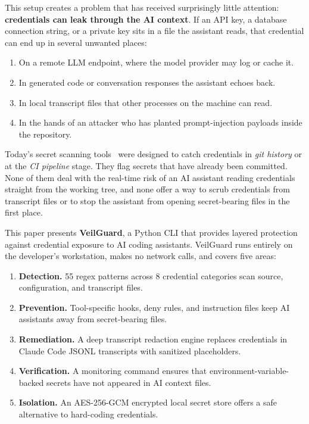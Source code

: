 \documentclass[conference]{IEEEtran}
\begin{document}
This setup creates a problem that has received surprisingly little attention:
\textbf{credentials can leak through the AI context}. If an API key, a
database connection string, or a private key sits in a file the assistant reads,
that credential can end up in several unwanted places:

\begin{enumerate}
  \item On a remote LLM endpoint, where the model provider may log or cache it.
  \item In generated code or conversation responses the assistant echoes back.
  \item In local transcript files that other processes on the machine can read.
  \item In the hands of an attacker who has planted prompt-injection payloads
        inside the repository.
\end{enumerate}

Today's secret scanning tools~\cite{gitleaks2024,trufflehog2024,
detectsecrets2024} were designed to catch credentials in \emph{git history} or
at the \emph{CI pipeline} stage. They flag secrets that have already been
committed. None of them deal with the real-time risk of an AI assistant reading
credentials straight from the working tree, and none offer a way to scrub
credentials from transcript files or to stop the assistant from opening
secret-bearing files in the first place.

This paper presents \textbf{VeilGuard}, a Python CLI that provides layered
protection against credential exposure to AI coding assistants. VeilGuard runs
entirely on the developer's workstation, makes no network calls, and covers five
areas:

\begin{enumerate}
  \item \textbf{Detection.} 55 regex patterns across 8 credential categories
        scan source, configuration, and transcript files.
  \item \textbf{Prevention.} Tool-specific hooks, deny rules, and instruction
        files keep AI assistants away from secret-bearing files.
  \item \textbf{Remediation.} A deep transcript redaction engine replaces
        credentials in Claude Code JSONL transcripts with sanitized placeholders.
  \item \textbf{Verification.} A monitoring command ensures that
        environment-variable-backed secrets have not appeared in AI context files.
  \item \textbf{Isolation.} An AES-256-GCM encrypted local secret store offers
        a safe alternative to hard-coding credentials.
\end{enumerate}
\end{document}
